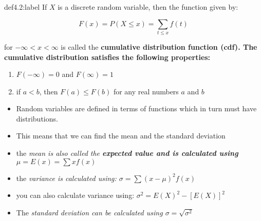 \begin{definition}{def4.2:label}
    If $X$ is a discrete random variable, then the function given by:

    $$
    F(x) = P(X \le x) = \sum_{t \le x} f(t)
    $$

    for $-\infty < x < \infty$ is called the \bf{cumulative distribution function (cdf)}. The cumulative distribution satisfies the following properties:

    \begin{enumerate}
        \item $F(-\infty) = 0$ and $F(\infty) = 1$
        \item if $a < b$, then $F(a) \le F(b)$ for any real numbers $a$ and $b$
    \end{enumerate}

    \begin{itemize}
        \item Random variables are defined in terms of functions which in turn must have distributions.
        \item This means that we can find the mean and the standard deviation
        \item the \it{mean} is also called the \bf{expected value} and is calculated using $\mu = E(x) = \sum xf(x)$
        \item the \it{variance} is calculated using: $\sigma = \sum (x-\mu)^2f(x)$
        \item you can also calculate variance using: $\sigma^2 =E(X)^2 - [E(X)]^2$
        \item The \it{standard deviation} can be calculated using $\sigma = \sqrt{\sigma^2}$
    \end{itemize}
\end{definition}